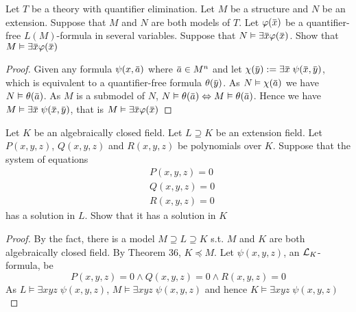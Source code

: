 \documentclass[11pt]{article}
\begin{document}
\begin{exercise}
Let \(T\) be a theory with quantifier elimination. Let \(M\) be a structure and \(N\) be an
extension. Suppose that \(M\) and \(N\) are both models of \(T\). Let \(\varphi(\barx)\) be a
quantifier-free \(L(M)\)-formula in several variables. Suppose that \(N\vDash\exists\barx\varphi(\barx)\). Show that \(M\vDash\exists\barx\varphi(\barx)\)
\end{exercise}

\begin{proof}
Given any formula \(\psi(x,\bara)\) where \(\bara\in M^n\) and let \(\chi(\bary):=\exists\barx\;\psi(\barx,\bary)\),
which is equivalent to a quantifier-free formula \(\theta(\bary)\). As \(N\vDash\chi(\bara)\) we
have \(N\vDash\theta(\bara)\). As \(M\) is a submodel of \(N\), \(N\vDash\theta(\bara)\Leftrightarrow M\vDash\theta(\bara)\). Hence we
have \(M\vDash\exists\barx\;\psi(\barx,\bary)\), that is \(M\vDash\exists\barx\varphi(\barx)\)
\end{proof}

\begin{exercise}
Let \(K\) be an algebraically closed field. Let \(L\supseteq K\) be an extension field.
Let \(P(x,y,z)\), \(Q(x,y,z)\) and \(R(x,y,z)\) be polynomials over \(K\). Suppose that the system
of equations
\begin{align*}
&P(x,y,z)=0\\
&Q(x,y,z)=0\\
&R(x,y,z)=0
\end{align*}
has a solution in \(L\). Show that it has a solution in \(K\)
\end{exercise}

\begin{proof}
By the fact, there is a model \(M\supseteq L\supseteq K\) s.t. \(M\) and \(K\) are both algebraically closed field.
By Theorem 36, \(K\preceq M\). Let \(\psi(x,y,z)\), an \(\mathcal{L}_K\)-formula, be
\begin{equation*}
P(x,y,z)=0\wedge Q(x,y,z)=0\wedge R(x,y,z)=0
\end{equation*}
As \(L\vDash\exists xyz\;\psi(x,y,z)\), \(M\vDash\exists xyz\;\psi(x,y,z)\) and hence \(K\vDash\exists xyz\;\psi(x,y,z)\)
\end{proof}
\end{document}

